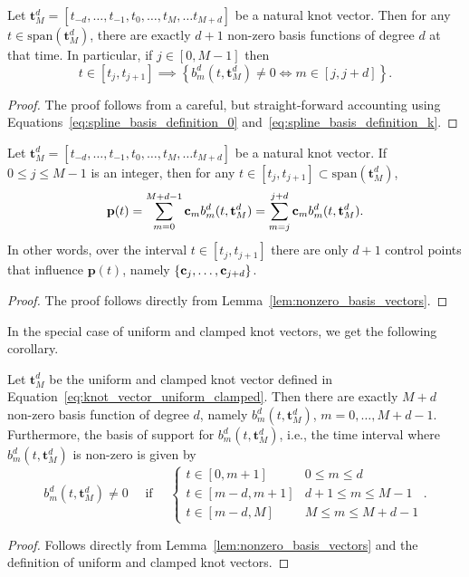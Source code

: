 \begin{lemma} \label{lem:nonzero_basis_vectors}
	Let $\mathbf{t}_M^d=[t_{-d}, \dots, t_{-1}, t_0, \dots, t_M, \dots t_{M+d}]$ be a natural knot vector.  Then for any $t\in\text{span}(\mathbf{t}_M^d)$, there are exactly $d+1$ non-zero basis functions of degree $d$ at that time.  In particular, if $j\in[0, M-1]$ then
		\[
		t\in[t_j, t_{j+1}] \implies \left\{	b_m^d(t, \mathbf{t}_M^d) \neq 0 \iff m\in[j, j+d]\right\}.
		\]		
\end{lemma}
\begin{proof}  The proof follows from a careful, but straight-forward accounting using Equations~\eqref{eq:spline_basis_definition_0} and~\eqref{eq:spline_basis_definition_k}.	
\end{proof}

\begin{corollary}\label{lem:finite_num_control_points}
	Let $\mathbf{t}_M^d=[t_{-d}, \dots, t_{-1}, t_0, \dots, t_M, \dots t_{M+d}]$ be a natural knot vector.  
	If $0\leq j \leq M-1$ is an integer, then for any $t\in[t_j, t_{j+1}]\subset\text{span}(\mathbf{t}_M^d)$,
	\[
	\mathbf{p}(t) = \sum_{m=0}^{M+d-1} \mathbf{c}_m b_m^d(t, \mathbf{t}_M^d) 
	              = \sum_{m=j}^{j+d} \mathbf{c}_m b_m^d(t,  \mathbf{t}_M^d).
	\]
	In other words, over the interval $t\in[t_j, t_{j+1}]$ there are only $d+1$ control points that influence $\mathbf{p}(t)$, namely $\{\mathbf{c}_j, \dots, \mathbf{c}_{j+d}\}$.
\end{corollary}
\begin{proof}
The proof follows directly from Lemma~\ref{lem:nonzero_basis_vectors}.	
\end{proof}

In the special case of uniform and clamped knot vectors, we get the following corollary.

\begin{corollary}\label{lem:nonzero_basis_vectors}
	Let $\mathbf{t}_M^d$ be the uniform and clamped knot vector defined in Equation~\eqref{eq:knot_vector_uniform_clamped}.
	Then there are exactly $M+d$ non-zero basis function of degree $d$, namely $b_m^d(t, \mathbf{t}_M^d)$, $m=0, \dots, M+d-1$.
	Furthermore, the basis of support for $b_m^d(t, \mathbf{t}_M^d)$, i.e., the time interval where $b_m^d(t, \mathbf{t}_M^d)$ is non-zero is given by
		\[
				b_m^d(t, \mathbf{t}_M^d) \neq 0 
				\quad \text{~if~} \quad
				\begin{cases}
				t \in [0, m+1] & 0\leq m \leq d \\
				t \in [m-d, m+1] & d+1 \leq m \leq M-1 \\
				t \in [m-d, M] & M \leq m \leq M+d-1
				\end{cases}.
		\]	
\end{corollary} 
\begin{proof}  Follows directly from Lemma~\ref{lem:nonzero_basis_vectors} and the definition of uniform and clamped knot vectors.
\end{proof}

